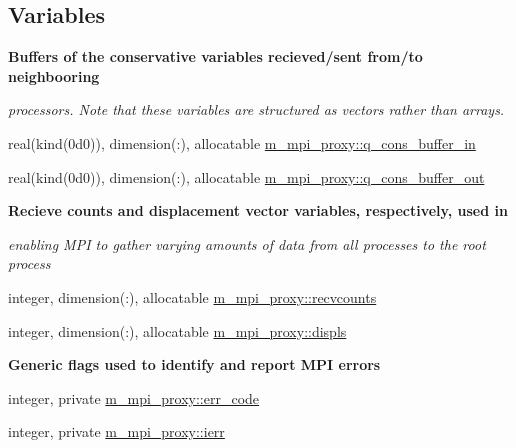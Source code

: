 \subsection*{Variables}
\begin{Indent}\textbf{ Buffers of the conservative variables recieved/sent from/to neighbooring}\par
{\em processors. Note that these variables are structured as vectors rather than arrays. }\begin{DoxyCompactItemize}
\item 
real(kind(0d0)), dimension(\+:), allocatable \hyperlink{namespacem__mpi__proxy_af08f3246d9efac15d6391dc4205d4611}{m\+\_\+mpi\+\_\+proxy\+::q\+\_\+cons\+\_\+buffer\+\_\+in}
\item 
real(kind(0d0)), dimension(\+:), allocatable \hyperlink{namespacem__mpi__proxy_a3d449655a88a9e5248af35a82caf877a}{m\+\_\+mpi\+\_\+proxy\+::q\+\_\+cons\+\_\+buffer\+\_\+out}
\end{DoxyCompactItemize}
\end{Indent}
\begin{Indent}\textbf{ Recieve counts and displacement vector variables, respectively, used in}\par
{\em enabling M\+PI to gather varying amounts of data from all processes to the root process }\begin{DoxyCompactItemize}
\item 
integer, dimension(\+:), allocatable \hyperlink{namespacem__mpi__proxy_a2198e825f0884d4ee9e96b6efdb69cee}{m\+\_\+mpi\+\_\+proxy\+::recvcounts}
\item 
integer, dimension(\+:), allocatable \hyperlink{namespacem__mpi__proxy_aebaa6e3cc66d2431c5fb49896d40d7e6}{m\+\_\+mpi\+\_\+proxy\+::displs}
\end{DoxyCompactItemize}
\end{Indent}
\begin{Indent}\textbf{ Generic flags used to identify and report M\+PI errors}\par
\begin{DoxyCompactItemize}
\item 
integer, private \hyperlink{namespacem__mpi__proxy_ae5709407e3600d19d79b183e409bb982}{m\+\_\+mpi\+\_\+proxy\+::err\+\_\+code}
\item 
integer, private \hyperlink{namespacem__mpi__proxy_a306ba163b09cfc692125f2c0ba82ef8c}{m\+\_\+mpi\+\_\+proxy\+::ierr}
\end{DoxyCompactItemize}
\end{Indent}


